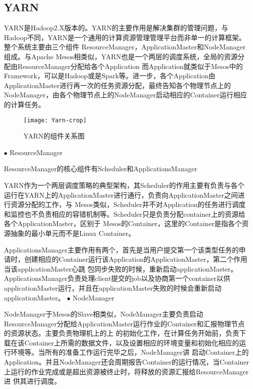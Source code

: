 \subsection{YARN}

YARN是Hadoop2.X版本的。YARN的主要作用是解决集群的管理问题，与Hadoop不同，YARN是一个通用的计算资源管理管理平台而非单一的计算框架。整个系统主要由三个组件
ResourceManager，ApplicationMaster和NodeManager组成。与Apache Mesos相类似，YARN也是一个两层的调度系统，全局的资源分配由ResourceManager分配给各个Application
而Application就类似于Mesos中的Framework，可以是Hadoop或是Spark等。进一步，各个Application由ApplicationMaster进行再一次的任务资源分配，最终告知各个物理节点上的
NodeManager，由各个物理节点上的NodeManager启动相应的Container运行相应的计算任务。
\begin{figure}[htbp]
\centering\texttt{[image: Yarn-crop]}
\caption{YARN的组件关系图}\label{fig:Yarn}
\end{figure}

$\bullet$ ResourceManager

ResourceManager的核心组件有Scheduler和ApplicationsManager

YARN作为一个两层调度策略的典型架构，其Scheduler的作用主要有负责与各个运行在YARN上的ApplicationMaster进行通行，负责向ApplicationMaster之间进行资源分配的工作，与
Mesos类似，Scheduler并不对Application的任务进行调度和监控也不负责相应的容错机制等。Scheduler只是负责分配container上的资源给各个ApplicationMaster，区别于
Mesos的Container，这里的Container是指各个资源抽象的最小单元而不是Linux Container。

ApplicationsManager主要作用有两个，首先是当用户提交第一个该类型任务的申请时，创建相应的Container运行该Application的ApplicationMaster，第二个作用当该applicationMaster心跳
包同步失败的时候，重新启动applicationMaster。
ApplicationsManager负责处理client提交的job以及协商第一个container以供applicationMaster运行，并且在applicationMaster失败的时候会重新启动applicationMaster。
$\bullet$ NodeManager

NodeManager于Mesos的Slave相类似，NodeManager主要负责启动ResourceManager分配给ApplicationMaster运行作业的Container和汇报物理节点的资源状态。主要负责物理机上的上
的初始化工作，在计算任务开始前，负责下载在该Container上所需的数据文件，以及设置相应的环境变量和初始化相应的运行环境等。当所有的准备工作运行完毕之后，NodeManager讲
启动Container上的Application。并且NodeManager还会周期报告Container的运行情况，当Container上运行的作业完成或是超出资源被终止时，将释放的资源汇报给ResourceManager进
供其进行调度。

